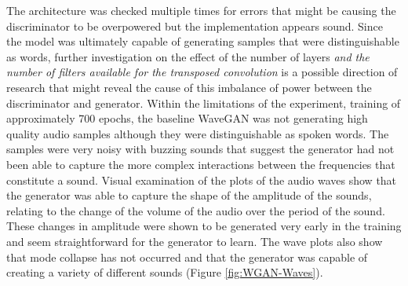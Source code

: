 \documentclass[a4paper, titlepage]{article}
\begin{document}
%
\newline
The architecture was checked multiple times for errors that might be causing the discriminator to be overpowered but the implementation appears sound.
Since the model was ultimately capable of generating samples that were distinguishable as words, further investigation on the effect of the number of layers \textit{and the number of filters available for the transposed convolution} is a possible direction of research that might reveal the cause of this imbalance of power between the discriminator and generator.
\newline
\newline
Within the limitations of the experiment, training of approximately 700 epochs, the baseline WaveGAN was not generating high quality audio samples although they were distinguishable as spoken words.
The samples were very noisy with buzzing sounds that suggest the generator had not been able to capture the more complex interactions between the frequencies that constitute a sound.
\newline
\newline
Visual examination of the plots of the audio waves show that the generator was able to capture the shape of the amplitude of the sounds, relating to the change of the volume of the audio over the period of the sound.
These changes in amplitude were shown to be generated very early in the training and seem straightforward for the generator to learn.
The wave plots also show that mode collapse has not occurred and that the generator was capable of creating a variety of different sounds (Figure \ref{fig:WGAN-Waves}).
\newline
%
\end{document}
